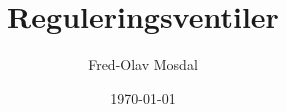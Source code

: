 \documentclass[aspectratio=169,xcolor=dvipsnames]{beamer}
\title[Control Valves]{Reguleringsventiler} %
\author[Fred-Olav] {Fred-Olav Mosdal}
\institute[Gand VGS] %
{
    Gand VGS \\
    VG3 Automasjon
}
\date{\today} %
\begin{document}
%
%
\begin{frame}
\titlepage
\end{frame}
%
%
%
\end{document}

